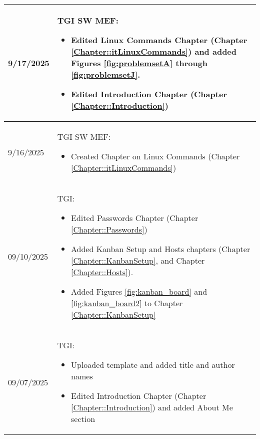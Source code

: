 \begin{longtable}{|l||p{13.5cm}|}
9/17/2025 & TGI SW MEF:
\begin{itemize}[topsep=0pt,itemsep=0pt,parsep=0pt,partopsep=0pt,leftmargin=12pt]
\item Edited Linux Commands Chapter (Chapter \ref{Chapter::itLinuxCommands}) and added Figures \ref{fig:problemsetA} through \ref{fig:problemsetJ}.
\item Edited Introduction Chapter (Chapter \ref{Chapter::Introduction})
\end{itemize} 
\\ \hline

9/16/2025 & TGI SW MEF:
\begin{itemize}[topsep=0pt,itemsep=0pt,parsep=0pt,partopsep=0pt,leftmargin=12pt]
\item Created Chapter on Linux Commands (Chapter \ref{Chapter::itLinuxCommands})
\end{itemize} 
\\ \hline

09/10/2025 & TGI:
\begin{itemize}[topsep=0pt,itemsep=0pt,parsep=0pt,partopsep=0pt,leftmargin=12pt]
\item Edited Passwords Chapter (Chapter \ref{Chapter::Passwords})
\item Added Kanban Setup and Hosts chapters (Chapter \ref{Chapter::KanbanSetup}, and Chapter \ref{Chapter::Hosts}).
\item Added Figures \ref{fig:kanban_board} and \ref{fig:kanban_board2} to Chapter \ref{Chapter::KanbanSetup}
\end{itemize} 
\\ \hline

09/07/2025 & TGI:
\begin{itemize}[topsep=0pt,itemsep=0pt,parsep=0pt,partopsep=0pt,leftmargin=12pt]
\item Uploaded template and added title and author names
\item Edited Introduction Chapter (Chapter \ref{Chapter::Introduction}) and added About Me section
\end{itemize} 
\\ \hline



\end{longtable}


